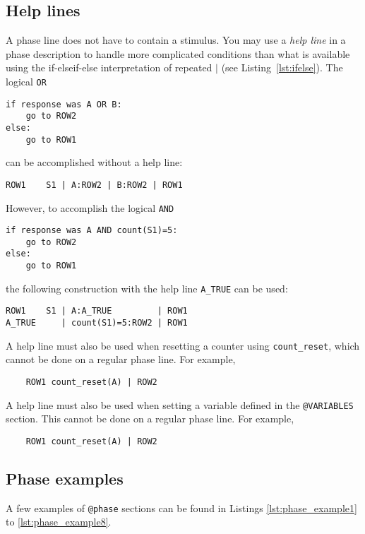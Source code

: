 \documentclass[11pt]{article}
\newcommand{\scr}[1]{\lstinline|#1|}
\begin{document}
\subsection{Help lines}
A phase line does not have to contain a stimulus. 
You may use a \emph{help line} in a phase description to handle more complicated conditions
than what is available using the if-elseif-else interpretation of repeated $|$ (see Listing~\ref{lst:ifelse}). The logical \scr{OR}
\begin{verbatim}
if response was A OR B:
    go to ROW2
else:
    go to ROW1
\end{verbatim}
can be accomplished without a help line:
\begin{verbatim}
ROW1    S1 | A:ROW2 | B:ROW2 | ROW1
\end{verbatim}
However, to accomplish the logical \scr{AND}
\begin{verbatim}
if response was A AND count(S1)=5:
    go to ROW2
else:
    go to ROW1
\end{verbatim}
the following construction with the help line \scr{A_TRUE} can be used:
\begin{verbatim}
ROW1    S1 | A:A_TRUE         | ROW1
A_TRUE     | count(S1)=5:ROW2 | ROW1
\end{verbatim}

A help line must also be used when resetting a counter using \scr{count_reset}, which cannot be done on a regular phase line. For example,
\begin{center}
	\begin{verbatim}
	ROW1 count_reset(A) | ROW2
	\end{verbatim}
\end{center}

A help line must also be used when setting a variable defined in the \verb|@VARIABLES| section. This cannot be done on a regular phase line. For example,
\begin{center}
	\begin{verbatim}
	ROW1 count_reset(A) | ROW2
	\end{verbatim}
\end{center}


\subsection{Phase examples}
A few examples of \verb|@phase| sections can be found in Listings \ref{lst:phase_example1} to \ref{lst:phase_example8}.
\end{document}
